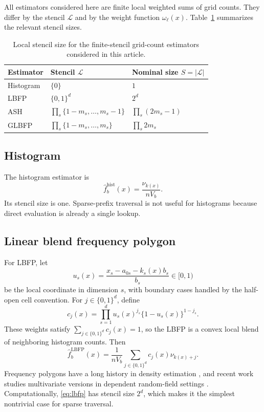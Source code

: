 \documentclass[pdflatex,sn-mathphys-ay]{sn-jnl}
\theoremstyle{thmstyleone}
\newcommand{\fhatb}{\widehat{f}_b}
\newcommand{\stencil}{\mathcal{L}}
\begin{document}
All estimators considered here are finite local weighted sums of grid counts. They differ by the stencil \(\stencil\) and by the weight function \(\omega_\ell(x)\). Table~\ref{tab:estimators} summarizes the relevant stencil sizes.

\begin{table}[t]
\centering
\caption{Local stencil size for the finite-stencil grid-count estimators considered in this article.}
\label{tab:estimators}
\begin{tabular}{lll}
\toprule
Estimator & Stencil \(\stencil\) & Nominal size \(S=|\stencil|\) \\
\midrule
Histogram & \(\{0\}\) & \(1\) \\
LBFP & \(\{0,1\}^d\) & \(2^d\) \\
ASH & \(\prod_s \{1-m_s,\ldots,m_s-1\}\) & \(\prod_s(2m_s-1)\) \\
GLBFP & \(\prod_s \{1-m_s,\ldots,m_s\}\) & \(\prod_s 2m_s\) \\
\bottomrule
\end{tabular}
\end{table}

\subsection{Histogram}

The histogram estimator is
\[
\fhatb^{\mathrm{hist}}(x)
=
\frac{\nu_{k(x)}}{nV_b}.
\]
Its stencil size is one. Sparse-prefix traversal is not useful for histograms because direct evaluation is already a single lookup.

\subsection{Linear blend frequency polygon}

For LBFP, let
\[
u_s(x)
=
\frac{x_s-a_{0s}-k_s(x)b_s}{b_s}
\in [0,1)
\]
be the local coordinate in dimension \(s\), with boundary cases handled by the half-open cell convention. For \(j\in\{0,1\}^d\), define
\[
c_j(x)
=
\prod_{s=1}^d
u_s(x)^{j_s}\{1-u_s(x)\}^{1-j_s}.
\]
These weights satisfy \(\sum_{j\in\{0,1\}^d}c_j(x)=1\), so the LBFP is a convex local blend of neighboring histogram counts.
Then
\begin{equation}
\fhatb^{\mathrm{LBFP}}(x)
=
\frac{1}{nV_b}
\sum_{j\in\{0,1\}^d}
c_j(x)\nu_{k(x)+j}.
\label{eq:lbfp}
\end{equation}
Frequency polygons have a long history in density estimation \citep{Scott1985FrequencyPolygon,Scott2015MDE}, and recent work studies multivariate versions in dependent random-field settings \citep{CarbonDuchesne2024}. Computationally, \eqref{eq:lbfp} has stencil size \(2^d\), which makes it the simplest nontrivial case for sparse traversal.
\end{document}
